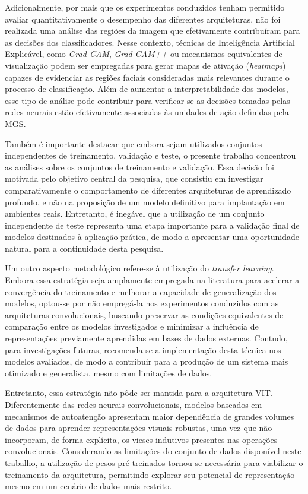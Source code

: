 Adicionalmente, por mais que os experimentos conduzidos tenham permitido avaliar quantitativamente o desempenho das diferentes arquiteturas, não foi realizada uma análise das regiões da imagem que efetivamente contribuíram para as decisões dos classificadores. Nesse contexto, técnicas de Inteligência Artificial Explicável, como \textit{Grad-CAM}, \textit{Grad-CAM++} ou mecanismos equivalentes de visualização podem ser empregadas para gerar mapas de ativação (\textit{heatmaps}) capazes de evidenciar as regiões faciais consideradas mais relevantes durante o processo de classificação. Além de aumentar a interpretabilidade dos modelos, esse tipo de análise pode contribuir para verificar se as decisões tomadas pelas redes neurais estão efetivamente associadas às unidades de ação definidas pela \acs{MGS}.

Também é importante destacar que embora sejam utilizados conjuntos independentes de treinamento, validação e teste, o presente trabalho concentrou as análises sobre os conjuntos de treinamento e validação. Essa decisão foi motivada pelo objetivo central da pesquisa, que consistiu em investigar comparativamente o comportamento de diferentes arquiteturas de aprendizado profundo, e não na proposição de um modelo definitivo para implantação em ambientes reais. Entretanto, é inegável que a utilização de um conjunto independente de teste representa uma etapa importante para a validação final de modelos destinados à aplicação prática, de modo a apresentar uma oportunidade natural para a continuidade desta pesquisa.

Um outro aspecto metodológico refere-se à utilização do \textit{transfer learning}. Embora essa estratégia seja amplamente empregada na literatura para acelerar a convergência do treinamento e melhorar a capacidade de generalização dos modelos, optou-se por não empregá-la nos experimentos conduzidos com as arquiteturas convolucionais, buscando preservar as condições equivalentes de comparação entre os modelos investigados e minimizar a influência de representações previamente aprendidas em bases de dados externas. Contudo, para investigações futuras, recomenda-se a implementação desta técnica nos modelos avaliados, de modo a contribuir para a produção de um sistema mais otimizado e generalista, mesmo com limitações de dados.

Entretanto, essa estratégia não pôde ser mantida para a arquitetura \acs{VIT}. Diferentemente das redes neurais convolucionais, modelos baseados em mecanismos de autoatenção apresentam maior dependência de grandes volumes de dados para aprender representações visuais robustas, uma vez que não incorporam, de forma explícita, os vieses indutivos presentes nas operações convolucionais. Considerando as limitações do conjunto de dados disponível neste trabalho, a utilização de pesos pré-treinados tornou-se necessária para viabilizar o treinamento da arquitetura, permitindo explorar seu potencial de representação mesmo em um cenário de dados mais restrito.

